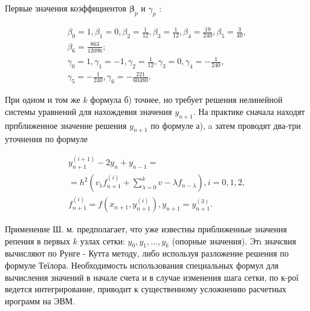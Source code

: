 \documentclass[10pt]{article}
\begin{document}
Первые значения коэффициентов $\boldsymbol{\beta}_{p}$ и $\gamma_{p}$ :



\[

\begin{gathered}

\beta_{0}=1, \beta_{1}=0, \beta_{2}=\frac{1}{12}, \beta_{3}=\frac{1}{12}, \beta_{4}=\frac{19}{240}, \beta_{5}=\frac{3}{40}, \\

\beta_{6}=\frac{863}{12096} ; \\

\gamma_{0}=1, \gamma_{1}=-1, \gamma_{2}=\frac{1}{12}, \gamma_{3}=0, \gamma_{4}=-\frac{1}{240}, \\

\gamma_{5}=-\frac{1}{240}, \gamma_{6}=-\frac{221}{60480} .

\end{gathered}

\]



При одном и том же $k$ формула б) точнее, но требует решения нелинейной системы уравнений для нахождевия значения $y_{n+1}$. На практике сначала находят прпближенное значение решения $y_{n+1}$ по формуле а), a затем проводят два-три уточнения по формуле



\[

\begin{gathered}

y_{n+1}^{(i+1)}-2 y_{n}+y_{n-1}= \\

=h^{2}\left(v_{1} f_{n+1}^{(i)}+\sum_{\lambda=0}^{k} v-\lambda f_{n-\lambda}\right), i=0,1,2, \\

f_{n+1}^{(i)}=f\left(x_{n+1}, y_{n+1}^{(i)}\right), y_{n+1}=y_{n+1}^{(3)} .

\end{gathered}

\]



Применение Ш. м. предполагает, что уже известны приближенные значения репения в первых $k$ узлах сетки: $y_{0}, y_{1}, \ldots, y_{k}$ (опорные значения). Этı значсвия вычисляют по Рунге - Кутта методу, либо используя разложение решения по формуле Теїлора. Необходимость использования специальных формул для вычисления значений в начале счета и в случае изменения шага сетки, по к-рої ведется интегрирование, приводит к существенному усложнению расчетных ирограмм на ЭВМ.
\end{document}
